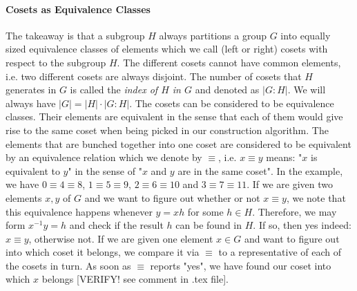 \paragraph{Cosets as Equivalence Classes}
The takeaway is that a subgroup $H$ always partitions a group $G$ into equally sized equivalence classes of elements which we call (left or right) cosets with respect to the subgroup $H$. The different cosets cannot have common elements, i.e. two different cosets are always disjoint. The number of cosets that $H$ generates in $G$ is called the \emph{index of $H$ in $G$} and denoted as $|G : H|$. We will always have $|G| = |H| \cdot |G : H|$. The cosets can be considered to be equivalence classes. Their elements are equivalent in the sense that each of them would give rise to the same coset when being picked in our construction algorithm. The elements that are bunched together into one coset are considered to be equivalent by an equivalence relation which we denote by $\equiv$, i.e. $x \equiv y$ means: "$x$ is equivalent to $y$" in the sense of "$x$ and $y$ are in the same coset". In the example, we have $0 \equiv 4 \equiv 8$, $1 \equiv 5 \equiv 9$, $2 \equiv 6 \equiv 10$ and $3 \equiv 7 \equiv 11$. If we are given two elements $x,y$ of $G$ and we want to figure out whether or not $x \equiv y$, we note that this equivalence happens whenever $y = x h$ for some $h \in H$. Therefore, we may form $x^{-1} y = h$ and check if the result $h$ can be found in $H$. If so, then yes indeed: $x \equiv y$, otherwise not. If we are given one element $x \in G$ and want to figure out into which coset it belongs, we compare it via $\equiv$ to a representative of each of the cosets in turn. As soon as $\equiv$ reports "yes", we have found our coset into which $x$ belongs [VERIFY! see comment in .tex file].


